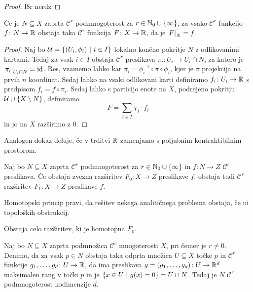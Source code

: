 \begin{proof}
l8r nerdz
\end{proof}

\begin{trditev}
Če je $N \subseteq X$ zaprta $\mathcal{C}^r$ podmnogoterost za
$r \in \mathbb{N}_0 \cup \left\{\infty\right\}$, za vsako $\mathcal{C}^r$ funkcijo
$f \colon N \to \mathbb{R}$ obstaja taka $\mathcal{C}^r$ funkcija
$F \colon X \to \mathbb{R}$, da je $\left. F\right|_{N}^{} = f$.
\end{trditev}

\begin{proof}
Naj bo $\mathcal{U} = \left\{(U_i, \phi_i)~\middle\vert~i \in I\right\}$ lokalno končno
pokritje $N$ z odlikovanimi kartami. Tedaj za vsak $i \in I$
obstaja $\mathcal{C}^r$ preslikava
$\pi_i \colon U_i \to U_i \cap N$, za katero je
$\left. \pi_i\right|_{U_i \cap N}^{} = \operatorname{id}$. Res, vzamemo lahko kar
$\pi_i = \phi_i^{-1} \circ \pi \circ \phi_i$, kjer je $\pi$
projekcija na prvih $n$ koordinat. Sedaj lahko na vsaki odlikovani
karti definiramo $f_i \colon U_i \to \mathbb{R}$ s predpisom
$f_i = f \circ \pi_i$. Sedaj lahko s particijo enote na $X$,
podrejeno pokritju $\mathcal{U} \cup \left\{X \setminus N\right\}$,
definiramo
\[
F = \sum_{i \in I} \chi_i \cdot f_i
\]
in jo na $X$ razširimo z $0$.
\end{proof}

\begin{opomba}
Analogen dokaz deluje, če v trditvi $\mathbb{R}$ zamenjamo s poljubnim
kontraktibilnim prostorom.
\end{opomba}

\begin{izrek}
Naj bo $N \subseteq X$ zaprta $\mathcal{C}^r$ podmnogoterost za
$r \in \mathbb{N}_0 \cup \left\{\infty\right\}$ in $f \colon N \to Z$ $\mathcal{C}^r$
preslikava. Če obstaja zvezna razširitev $F_0 \colon X \to Z$
preslikave $f$, obstaja tudi $\mathcal{C}^r$ razširitev
$F_1 \colon X \to Z$ preslikave $f$.
\end{izrek}

\begin{opomba}
Homotopski princip pravi, da rešitev nekega analitičnega problema
obstaja, če ni topoloških obstrukcij.
\end{opomba}

\begin{opomba}
Obstaja celo razširitev, ki je homotopna $F_0$.
\end{opomba}

\begin{izrek}
Naj bo $N \subseteq X$ zaprta podmnožica $\mathcal{C}^r$
mnogoterosti $X$, pri čemer je $r \ne 0$. Denimo, da za vsak
$p \in N$ obstaja taka odprta množica $U \subseteq X$ točke $p$ in
$\mathcal{C}^r$ funkcije $g_1, \dots, g_d \colon U \to \mathbb{R}$, da ima
preslikava $g = (g_1, \dots, g_d) \colon U \to \mathbb{R}^d$ maksimalen
rang v točki $p$ in je $\left\{x \in U~\middle\vert~g(x) = 0\right\} = U \cap N$. Tedaj
je $N$ $\mathcal{C}^r$ podmnogoterost kodimenzije $d$.
\end{izrek}

